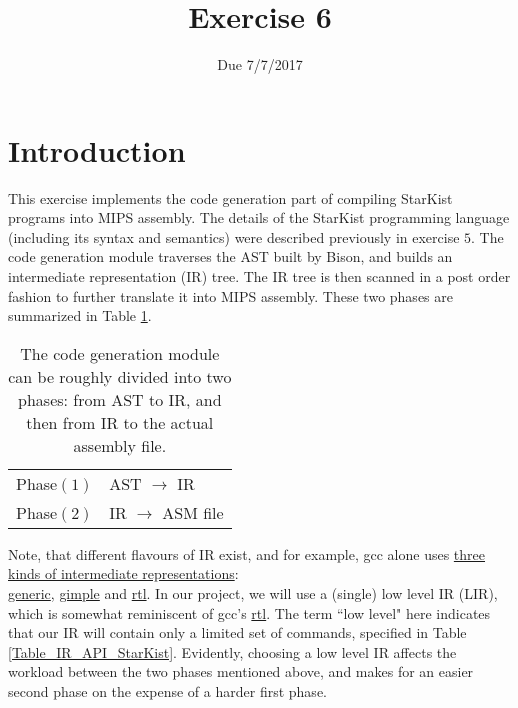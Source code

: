 \documentclass{article}
\begin{document}
\title{Exercise 6}
\date{Due 7/7/2017}
\maketitle

\section{Introduction}
This exercise implements the code generation part of compiling StarKist
programs into MIPS assembly. The details of the StarKist programming language
(including its syntax and semantics) were described previously in exercise $5$.
The code generation module traverses the AST built by Bison,
and builds an intermediate representation (IR) tree.
The IR tree is then scanned in a post order fashion
to further translate it into MIPS assembly.
These two phases are summarized in Table \ref{Table_The_Two_Phases_Of_Code_Gen}.
\begin{table}[h]
\centering
\begin{tabular}{ l l}
  Phase$(1)$   & AST $\rightarrow$ IR       \\
  Phase$(2)$   & IR  $\rightarrow$ ASM file \\
\end{tabular}
\caption{
The code generation module can be roughly divided into two phases:
from AST to IR, and then from IR to the actual assembly file.
\label{Table_The_Two_Phases_Of_Code_Gen}}
\end{table}
Note, that different flavours of IR exist, and for example,
gcc alone uses \href{https://gcc.gnu.org/onlinedocs/gccint/Tree-SSA.html#Tree-SSA}
{three kinds of intermediate representations}:\\
\href{https://gcc.gnu.org/onlinedocs/gccint/GENERIC.html#GENERIC}{generic},
\href{https://gcc.gnu.org/onlinedocs/gccint/GIMPLE.html#GIMPLE}{gimple} and
\href{https://gcc.gnu.org/onlinedocs/gccint/RTL.html#RTL}{rtl}.
In our project, we will use a (single) low level IR (LIR),
which is somewhat reminiscent of gcc's
\href{https://gcc.gnu.org/onlinedocs/gccint/RTL.html#RTL}{rtl}.
The term ``low level" here indicates that our IR will contain only a limited set
of commands, specified in Table \ref{Table_IR_API_StarKist}.
Evidently, choosing a low level IR affects the workload between the two phases
mentioned above, and makes for an easier second phase on the expense of
a harder first phase.
\end{document}
